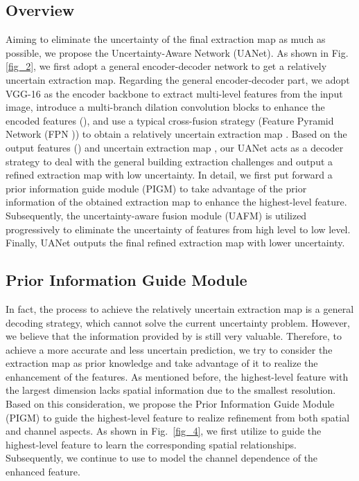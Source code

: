\documentclass[lettersize,journal]{IEEEtran}
\begin{document}
\subsection{Overview}
Aiming to eliminate the uncertainty of the final extraction map as much as possible, we propose the Uncertainty-Aware Network (UANet). As shown in Fig.\ref{fig_2}, we first adopt a general encoder-decoder network to get a relatively uncertain extraction map. Regarding the general encoder-decoder part, we adopt VGG-16 \cite{VGG} as the encoder backbone to extract multi-level features from the input image, introduce a multi-branch dilation convolution blocks to enhance the encoded features (), and use a typical cross-fusion strategy (Feature Pyramid Network (FPN \cite{FPN})) to obtain a relatively uncertain extraction map . Based on the output features () and uncertain extraction map , our UANet acts as a decoder strategy to deal with the general building extraction challenges and output a refined extraction map with low uncertainty.
In detail, we first put forward a prior information guide module (PIGM) to take advantage of the prior information of the obtained extraction map to enhance the highest-level feature. Subsequently, the uncertainty-aware fusion module (UAFM) is utilized progressively to eliminate the uncertainty of features from high level to low level. Finally, UANet outputs the final refined extraction map with lower uncertainty.

\subsection{Prior Information Guide Module}

In fact, the process to achieve the relatively uncertain extraction map  is a general decoding strategy, which cannot solve the current uncertainty problem. However, we believe that the information provided by  is still very valuable. Therefore, to achieve a more accurate and less uncertain prediction, we try to consider the extraction map  as prior knowledge and take advantage of it to realize the enhancement of the features. As mentioned before, the highest-level feature with the largest dimension lacks spatial information due to the smallest resolution. Based on this consideration, we propose the Prior Information Guide Module (PIGM) to guide the highest-level feature to realize refinement from both spatial and channel aspects. As shown in Fig.~\ref{fig_4}, we first utilize  to guide the highest-level feature to learn the corresponding spatial relationships. Subsequently, we continue to use  to model the channel dependence of the enhanced feature.
\end{document}
